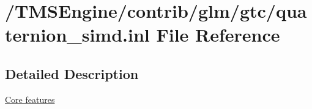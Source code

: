 \hypertarget{quaternion__simd_8inl}{}\section{/\+T\+M\+S\+Engine/contrib/glm/gtc/quaternion\+\_\+simd.inl File Reference}
\label{quaternion__simd_8inl}


\subsection{Detailed Description}
\hyperlink{group__core}{Core features} 